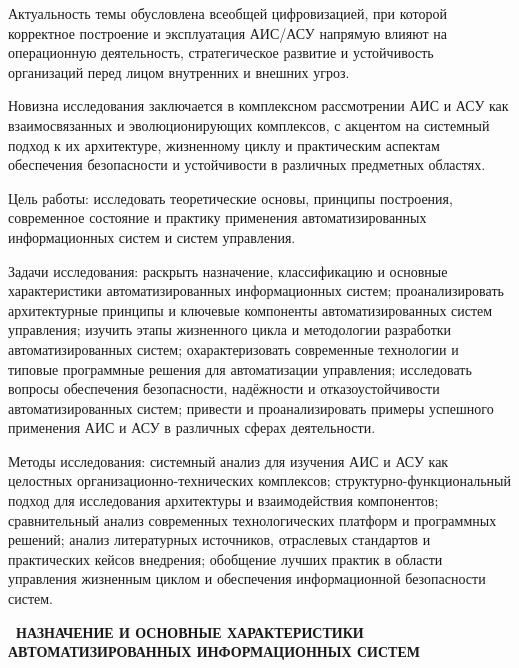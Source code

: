 \documentclass{SibFU-docs}
\begin{document}
Актуальность темы обусловлена всеобщей цифровизацией, при которой корректное построение и эксплуатация АИС/АСУ напрямую влияют на операционную деятельность, стратегическое развитие и устойчивость организаций перед лицом внутренних и внешних угроз.

Новизна исследования заключается в комплексном рассмотрении АИС и АСУ как взаимосвязанных и эволюционирующих комплексов, с акцентом на системный подход к их архитектуре, жизненному циклу и практическим аспектам обеспечения безопасности и устойчивости в различных предметных областях.

Цель работы: исследовать теоретические основы, принципы построения, современное состояние и практику применения автоматизированных информационных систем и систем управления.

Задачи исследования:
раскрыть назначение, классификацию и основные характеристики автоматизированных информационных систем;
проанализировать архитектурные принципы и ключевые компоненты автоматизированных систем управления;
изучить этапы жизненного цикла и методологии разработки автоматизированных систем;
охарактеризовать современные технологии и типовые программные решения для автоматизации управления;
исследовать вопросы обеспечения безопасности, надёжности и отказоустойчивости автоматизированных систем;
привести и проанализировать примеры успешного применения АИС и АСУ в различных сферах деятельности.

Методы исследования:
системный анализ для изучения АИС и АСУ как целостных организационно-технических комплексов;
структурно-функциональный подход для исследования архитектуры и взаимодействия компонентов;
сравнительный анализ современных технологических платформ и программных решений;
анализ литературных источников, отраслевых стандартов и практических кейсов внедрения;
обобщение лучших практик в области управления жизненным циклом и обеспечения информационной безопасности систем.

\newpage
\vspace*{-2.5em}
\begin{center}\textbf{\thesection\ НАЗНАЧЕНИЕ И ОСНОВНЫЕ ХАРАКТЕРИСТИКИ АВТОМАТИЗИРОВАННЫХ ИНФОРМАЦИОННЫХ СИСТЕМ}\end{center}
\vspace*{-1.5em}
\end{document}
